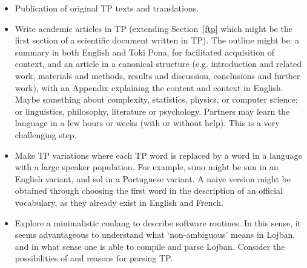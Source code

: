 \begin{itemize}
  \item Publication of original TP texts and translations.
  \item Write academic articles in TP
    (extending Section~\ref{ftp} which might be the
    first section of a scientific document written in TP).
    The outline might be:
    a summary in both English and Toki Pona, for
    facilitated acquisition of context,
    and an article in a canonical structure
    (e.g. introduction and related work, materials and methods,
    results and discussion, conclusions and further work),
    with an Appendix explaining the content and context in English.
    Maybe something about complexity, statistics, physics,
    or computer science;
    or linguistics, philosophy, literature
    or psychology.
    Partners may learn the language in a few hours or weeks
    (with or without help).
    This is a very challenging step.
  \item Make TP variations where each TP word is replaced by a word in
    a language with a large speaker population. 
For example,
suno might be sun in an English variant,
and sol in a Portuguese variant.
A naive version might be obtained through
choosing the first word in the description of
an official vocabulary, as they already exist in English and French.
  \item Explore a minimalistic conlang to describe software
    routines.
    In this sense, it seems advantageous
    to understand what `non-ambiguous' means in Lojban,
    and in what sense one is able to compile and parse Lojban.
    Consider the possibilities of and reasons for parsing TP.
\end{itemize}

\appendix
